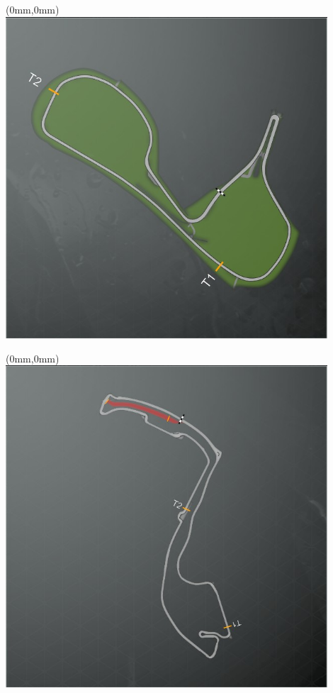 \null\newpage
\begin{textblock*}{30mm}(0mm,0mm)%
\includegraphics[width=120mm]{TR/2015-05-20_00011.png}
\end{textblock*}
\null\newpage
\begin{textblock*}{30mm}(0mm,0mm)%
\includegraphics[width=120mm]{TR/2015-05-20_00001.png}
\end{textblock*}
